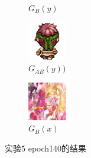 \documentclass{beamer}
\begin{document}
\begin{frame}
\begin{figure}[htb]
\begin{subfigure}[b]{0.23\linewidth}
        \caption{$G_B(y)$}
      \end{subfigure}
      \begin{subfigure}[b]{0.23\linewidth}
        \includegraphics[width=\linewidth]{exp5_epoch140_rec_B.png}
        \caption{$G_{AB}(y))$}
      \end{subfigure}
      \begin{subfigure}[b]{0.23\linewidth}
        \includegraphics[width=\linewidth]{exp5_epoch140_idt_B.png}
        \caption{$G_B(x)$}
      \end{subfigure}
      \caption{实验5 epoch140的结果}
      \label{fig:exp5epoch140}
\end{figure}
\end{frame}
\end{document}
